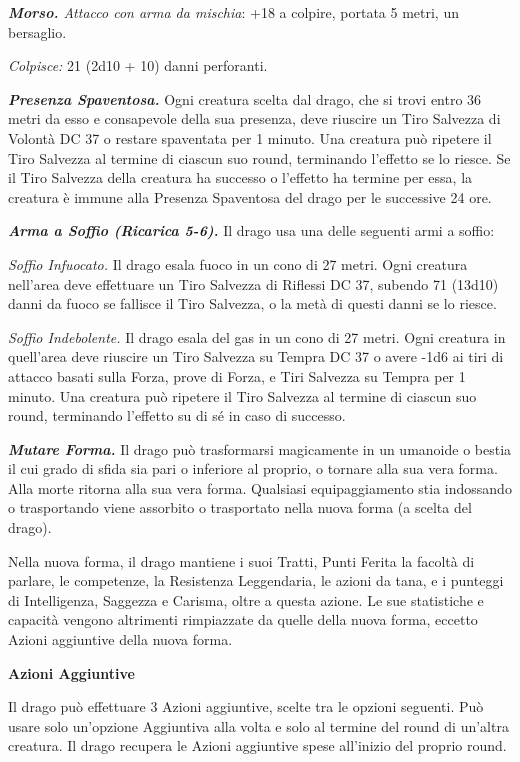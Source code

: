\begin{multicols}{2}
{\emph{\textbf{Morso.} Attacco con arma da mischia}: +18 a colpire, portata 5 metri, un bersaglio.

\emph{Colpisce:} 21 (2d10 + 10) danni perforanti.

\emph{\textbf{Presenza Spaventosa.}} Ogni creatura scelta dal drago, che si trovi entro 36 metri da esso e consapevole della sua presenza, deve riuscire un Tiro Salvezza di Volontà DC 37 o restare spaventata per 1 minuto. Una creatura può ripetere il Tiro Salvezza al termine di ciascun suo round, terminando l'effetto se lo riesce. Se il Tiro Salvezza della creatura ha successo o l'effetto ha termine per essa, la creatura è immune alla Presenza Spaventosa del drago per le successive 24 ore.

\emph{\textbf{Arma a Soffio (Ricarica 5-6).}} Il drago usa una delle seguenti armi a soffio:

\emph{Soffio Infuocato.} Il drago esala fuoco in un cono di 27 metri. Ogni creatura nell'area deve effettuare un Tiro Salvezza di Riflessi DC 37, subendo 71 (13d10) danni da fuoco se fallisce il Tiro Salvezza, o la metà di questi danni se lo riesce.

\emph{Soffio Indebolente.} Il drago esala del gas in un cono di 27 metri. Ogni creatura in quell'area deve riuscire un Tiro Salvezza su Tempra DC 37 o avere -1d6 ai tiri di attacco basati sulla Forza, prove di Forza, e Tiri Salvezza su Tempra per 1 minuto. Una creatura può ripetere il Tiro Salvezza al termine di ciascun suo round, terminando l'effetto su di sé in caso di successo.

\emph{\textbf{Mutare Forma.}} Il drago può trasformarsi magicamente in un umanoide o bestia il cui grado di sfida sia pari o inferiore al proprio, o tornare alla sua vera forma. Alla morte ritorna alla sua vera forma. Qualsiasi equipaggiamento stia indossando o trasportando viene assorbito o trasportato nella nuova forma (a scelta del drago).

Nella nuova forma, il drago mantiene i suoi Tratti, Punti Ferita la facoltà di parlare, le competenze, la Resistenza Leggendaria, le azioni da tana, e i punteggi di Intelligenza, Saggezza e Carisma, oltre a questa azione. Le sue statistiche e capacità vengono altrimenti rimpiazzate da quelle della nuova forma, eccetto Azioni aggiuntive della nuova forma.

\textbf{Azioni Aggiuntive}

Il drago può effettuare 3 Azioni aggiuntive, scelte tra le opzioni seguenti. Può usare solo un'opzione Aggiuntiva alla volta e solo al termine del round di un'altra creatura. Il drago recupera le Azioni aggiuntive spese all'inizio del proprio round.

}
\end{multicols}
